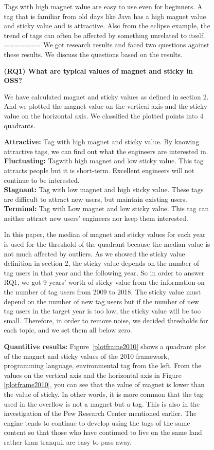 \documentclass[conference]{IEEEtran}
\begin{document}
\begin{figure}[t]
\begin{oframed}
 Tags with high magnet value are easy to use even for beginners. A tag that is familiar from old days like Java has a high magnet value and sticky value and is attractive. Also from the eclipse example, the trend of tags can often be affected by something unrelated to itself.
 \smallskip\smallskip
=======
We got research results and faced two questions against these results. We discuss the questions based on the results.
\smallskip
\smallskip

\textbf{(RQ1) What are typical values of magnet and sticky in OSS?}
\smallskip

We have calculated magnet and sticky values as defined in section 2. And we plotted the magnet value on the vertical axis and the sticky value on the horizontal axis. We classified the plotted points into 4 quadrants.
\smallskip
\smallskip

\textbf{Attractive:} Tag with high magnet and sticky value. By knowing attractive tags, we can find out what the engineers are interested in.\\
\textbf{Fluctuating:} Tagwith high magnet and low sticky value. This tag attracts people but it is short-term. Excellent engineers will not continue to be interested.\\
\textbf{Stagnant:} Tag with low magnet and high sticky value. These tags are difficult to attract new users, but maintain existing users.\\
\textbf{Terminal:} Tag with Low magnet and low sticky value. This tag can neither attract new users' engineers nor keep them interested.
\smallskip
\smallskip

In this paper, the median of magnet and sticky values for each year is used for the threshold of the quadrant because the median value is not much affected by outliers. As we showed the sticky value definition in section 2, the sticky value depends on the number of tag users in that year and the following year. So in order to answer RQ1, we got 9 years' worth of sticky value from the information on the number of tag users from 2009 to 2018. The sticky value must depend on the number of new tag users but if the number of new tag users in the target year is too low, the sticky value will be too small. Therefore, in order to remove noise, we decided thresholds for each topic, and we set them all below zero. 
\medskip


\textbf{Quantitive results:}
Figure~\ref{plotframe2010} shows a quadrant plot of the magnet and sticky values ​​of the 2010 framework, programming language, environmental tag from the left. From the values ​​on the vertical axis and the horizontal axis in Figure \ref{plotframe2010}, you can see that the value of magnet is lower than the value of sticky. In other words, it is more common that the tag used in the overflow is not a magnet but a tag. This is also in the investigation of the Pew Research Center mentioned earlier. The engine tends to continue to develop using the tags of the same content so that those who have continued to live on the same land rather than tranquil are easy to pass away.\smallskip
\smallskip


\end{oframed}
\end{figure}
\end{document}
